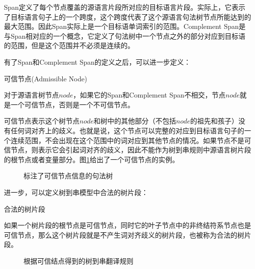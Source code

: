 \parinterval Span定义了每个节点覆盖的源语言片段所对应的目标语言片段。实际上，它表示了目标语言句子上的一个跨度，这个跨度代表了这个源语言句法树节点所能达到的最大范围。因此Span实际上是一个目标语单词索引的范围。Complement Span是与Span相对应的一个概念，它定义了句法树中一个节点之外的部分对应到目标语的范围，但是这个范围并不必须是连续的。

\parinterval 有了Span和Complement Span的定义之后，可以进一步定义：

\vspace{0.5em}
\begin{definition} 可信节点(Admissible Node)

{\small
对于源语言树节点$node$，如果它的Span和Complement Span不相交，节点$node$就是一个可信节点，否则是一个不可信节点。
}
\end{definition}

\parinterval 可信节点表示这个树节点$node$和树中的其他部分（不包括$node$的祖先和孩子）没有任何词对齐上的歧义。也就是说，这个节点可以完整的对应到目标语言句子的一个连续范围，不会出现在这个范围中的词对应到其他节点的情况。如果节点不是可信节点，则表示它会引起词对齐的歧义，因此不能作为树到串规则中源语言树片段的根节点或者变量部分。图\ref{fig:4-51}给出了一个可信节点的实例。

\begin{figure}[htp]
\centering

\caption{标注了可信节点信息的句法树}
\label{fig:4-51}
\end{figure}

\parinterval 进一步，可以定义树到串模型中合法的树片段：

\vspace{0.5em}
\begin{definition} 合法的树片段

{\small
如果一个树片段的根节点是可信节点，同时它的叶子节点中的非终结符系节点也是可信节点，那么这个树片段就是不产生词对齐歧义的树片段，也被称为合法的树片段。
}
\end{definition}

\begin{figure}[htp]
\centering

\caption{根据可信结点得到的树到串翻译规则}
\label{fig:4-52}
\end{figure}

